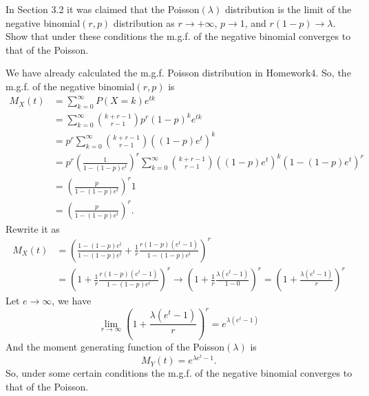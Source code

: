 \documentclass[14pt]{elegantbook}
\begin{document}
    \setcounter{exer}{14}
    \begin{exercise}
        In Section 3.2 it was claimed that the Poisson$(\lambda)$ distribution is the limit of the negative binomial$(r,p)$ distribution as $r\to +\infty$, $p \to1$, and $r(1-p)\to \lambda$. Show that under these conditions the m.g.f. of the negative binomial converges to that of the Poisson. 
    \end{exercise}
    \begin{solution}
        We have already calculated the m.g.f. Poisson distribution in Homework4. So, the m.g.f. of the negative binomial$(r,p)$ is
        \begin{align*}
            M_X(t)&=\sum_{k=0}^{\infty}P(X=k)e^{tk}\\
            &=\sum_{k=0}^{\infty}\binom{k+r-1}{r-1}p^r(1-p)^k e^{tk}\\
            &=p^r\sum_{k=0}^{\infty}\binom{k+r-1}{r-1}((1-p)e^{t})^k\\
            &=p^r\left(\frac{1}{1-(1-p)e^t}\right)^r\sum_{k=0}^{\infty}\binom{k+r-1}{r-1}((1-p)e^{t})^k(1-(1-p)e^t)^r\\
            &=\left(\frac{p}{1-(1-p)e^t}\right)^r1\\
            &=\left(\frac{p}{1-(1-p)e^t}\right)^r. 
        \end{align*}
        Rewrite it as
        \begin{align*}
            M_X(t)&=\left(\frac{1-(1-p)e^t}{1-(1-p)e^t}+\frac{1}{r}\frac{r(1-p)(e^t-1)}{1-(1-p)e^t}\right)^r\\
            &=\left(1+\frac{1}{r}\frac{r(1-p)(e^t-1)}{1-(1-p)e^t}\right)^r\to\left(1+\frac{1}{r}\frac{\lambda(e^t-1)}{1-0}\right)^r=\left(1+\frac{\lambda (e^t-1)}{r}\right)^r
        \end{align*}
        Let $e\to\infty$, we have
        \[\lim_{r\to\infty}\left(1+\frac{\lambda (e^t-1)}{r}\right)^r=e^{\lambda(e^t-1)}\]
        And the moment generating function of the Poisson$(\lambda)$ is
        \[M_Y(t)=e^{\lambda e^{t}-1}. \]
        So, under some certain conditions the m.g.f. of the negative binomial converges to that of the Poisson. 
    \end{solution}
\end{document}
